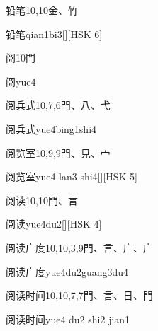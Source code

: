 \begin{Entry}{铅笔}{10,10}{⾦、⽵}
  \begin{Phonetics}{铅笔}{qian1bi3}[][HSK 6]
  \end{Phonetics}
\end{Entry}

\begin{Entry}{阅}{10}{⾨}
  \begin{Phonetics}{阅}{yue4}
  \end{Phonetics}
\end{Entry}

\begin{Entry}{阅兵式}{10,7,6}{⾨、⼋、⼷}
  \begin{Phonetics}{阅兵式}{yue4bing1shi4}
  \end{Phonetics}
\end{Entry}

\begin{Entry}{阅览室}{10,9,9}{⾨、⾒、⼧}
  \begin{Phonetics}{阅览室}{yue4 lan3 shi4}[][HSK 5]
  \end{Phonetics}
\end{Entry}

\begin{Entry}{阅读}{10,10}{⾨、⾔}
  \begin{Phonetics}{阅读}{yue4du2}[][HSK 4]
  \end{Phonetics}
\end{Entry}

\begin{Entry}{阅读广度}{10,10,3,9}{⾨、⾔、⼴、⼴}
  \begin{Phonetics}{阅读广度}{yue4du2guang3du4}
  \end{Phonetics}
\end{Entry}

\begin{Entry}{阅读时间}{10,10,7,7}{⾨、⾔、⽇、⾨}
  \begin{Phonetics}{阅读时间}{yue4 du2 shi2 jian1}
  \end{Phonetics}
\end{Entry}

